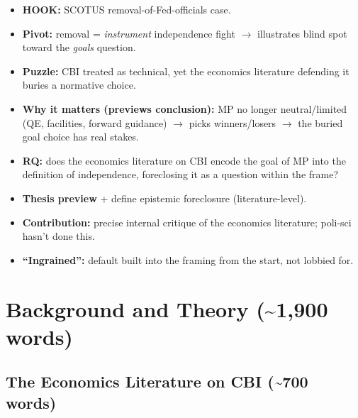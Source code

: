 \documentclass[12pt,a4paper]{article}
\begin{document}
\begin{doublespace}
\begin{itemize}
    \item \textbf{HOOK:} SCOTUS removal-of-Fed-officials case.
    \item \textbf{Pivot:} removal = \textit{instrument} independence fight $\rightarrow$ illustrates blind spot toward the \textit{goals} question.
    \item \textbf{Puzzle:} CBI treated as technical, yet the economics literature defending it buries a normative choice.
    \item \textbf{Why it matters (previews conclusion):} MP no longer neutral/limited (QE, facilities, forward guidance) $\rightarrow$ picks winners/losers $\rightarrow$ the buried goal choice has real stakes.
    \item \textbf{RQ:} does the economics literature on CBI encode the goal of MP into the definition of independence, foreclosing it as a question within the frame?
    \item \textbf{Thesis preview} + define epistemic foreclosure (literature-level).
    \item \textbf{Contribution:} precise internal critique of the economics literature; poli-sci hasn't done this.
    \item \textbf{``Ingrained'':} default built into the framing from the start, not lobbied for.
\end{itemize}

\section{Background and Theory (\textasciitilde1,900 words)}

\subsection{The Economics Literature on CBI (\textasciitilde700 words)}


\end{doublespace}
\end{document}
